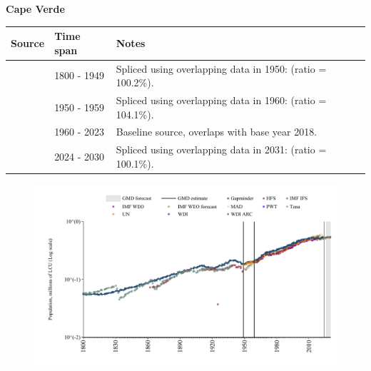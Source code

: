 \documentclass[12pt,a4paper,landscape]{article}
\begin{document}
\begin{adjustbox}{max totalsize={\paperwidth}{\paperheight},center}
\begin{minipage}[t][\textheight][t]{\textwidth}
\vspace*{0.5cm}
{}
\begin{center}
{\Large\bfseries Cape Verde}
\end{center}
\vspace{0.5cm}
\begin{table}[H]
\centering
\small
\begin{tabular}{|l|l|l|}
\hline
\textbf{Source} & \textbf{Time span} & \textbf{Notes} \\
\hline
\rowcolor{white}\cite{Gapminder}& 1800 - 1949 &Spliced using overlapping data in 1950: (ratio = 100.2\%).\\
\rowcolor{lightgray}\cite{IMF_IFS}& 1950 - 1959 &Spliced using overlapping data in 1960: (ratio = 104.1\%).\\
\rowcolor{white}\cite{WDI}& 1960 - 2023 &Baseline source, overlaps with base year 2018.\\
\rowcolor{lightgray}\cite{Gapminder}& 2024 - 2030 &Spliced using overlapping data in 2031: (ratio = 100.1\%).\\
\hline
\end{tabular}
\end{table}
\begin{figure}[H]
\centering
\includegraphics[width=\textwidth,height=0.6\textheight,keepaspectratio]{graphs/CPV_pop.pdf}
\end{figure}
\end{minipage}
\end{adjustbox}
\end{document}
